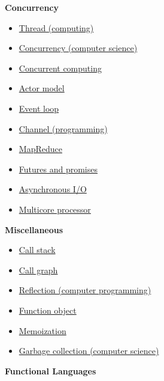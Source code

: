 \documentclass[11pt]{article}
\begin{document}
\textbf{Concurrency} 

\begin{itemize}
\item \href{https://en.wikipedia.org/wiki/Thread_(computing)}{Thread (computing)}
\item \href{https://en.wikipedia.org/wiki/Concurrency_(computer_science)}{Concurrency (computer science)}
\item \href{https://en.wikipedia.org/wiki/Concurrent_computing}{Concurrent computing }
\item \href{https://en.wikipedia.org/wiki/Actor_model}{Actor model }
\item \href{https://en.wikipedia.org/wiki/Event_loop}{Event loop }
\item \href{https://en.wikipedia.org/wiki/Channel_(programming)}{Channel (programming)}
\item \href{https://en.wikipedia.org/wiki/MapReduce}{MapReduce }
\item \href{https://en.wikipedia.org/wiki/Futures_and_promises}{Futures and promises}
\item \href{https://en.wikipedia.org/wiki/Asynchronous_I/O}{Asynchronous I/O}
\item \href{https://en.wikipedia.org/wiki/Multi-core_processor}{Multicore processor}
\end{itemize}

\textbf{Miscellaneous}

\begin{itemize}
\item \href{https://en.wikipedia.org/wiki/Call_stack}{Call stack}
\item \href{https://en.wikipedia.org/wiki/Call_graph}{Call graph}

\item \href{https://en.wikipedia.org/wiki/Reflection_\%28computer_programming\%29}{Reflection (computer programming)}

\item \href{https://en.wikipedia.org/wiki/Function_object}{Function object}

\item \href{https://en.wikipedia.org/wiki/Memoization}{Memoization}

\item \href{https://en.wikipedia.org/wiki/Garbage_collection_\%28computer_science\%29}{Garbage collection (computer science)}
\end{itemize}

\textbf{Functional Languages}
\end{document}
